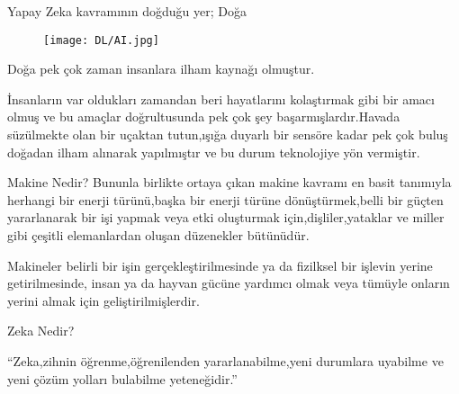 \documentclass{beamer}                                                                                          %
\begin{document}
	
	\begin{frame}{\color{myred1}
    		    Yapay Zeka kavramının doğduğu yer;  Doğa \color{black}}
	    \begin{center}
		    \justifying
		        \begin{figure}
    		        \vspace{-5}
    		        \centering
    		        \texttt{[image: DL/AI.jpg]}
		        \end{figure}
		        \vspace{20}
                \color{myred1} \color{black}Doğa pek çok zaman insanlara ilham kaynağı olmuştur.\par \vspace{10}
                \color{myred1} \color{black}İnsanların var oldukları zamandan beri hayatlarını kolaştırmak gibi bir amacı olmuş ve bu amaçlar doğrultusunda pek çok şey başarmışlardır.Havada süzülmekte olan bir uçaktan tutun,ışığa duyarlı bir sensöre kadar pek çok buluş doğadan ilham alınarak yapılmıştır ve bu durum teknolojiye yön vermiştir.

        \end{center}  
    \end{frame}
    
    \begin{frame}{Makine Nedir?}
        \justifying
            \color{myred1} \color{black}Bununla birlikte ortaya çıkan makine kavramı en basit tanımıyla  herhangi bir enerji türünü,başka bir enerji türüne dönüştürmek,belli bir güçten yararlanarak bir işi yapmak veya etki oluşturmak için,dişliler,yataklar ve miller gibi çeşitli elemanlardan oluşan düzenekler bütünüdür.\par \vspace{10}
            \color{myred1} \color{black}Makineler belirli bir işin gerçekleştirilmesinde ya da fizilksel bir işlevin yerine getirilmesinde, insan ya da hayvan gücüne yardımcı olmak veya tümüyle onların yerini almak için geliştirilmişlerdir.

    \end{frame}
    
  
    \begin{frame}{Zeka Nedir?}
        \justifying
        
        “Zeka,zihnin öğrenme,öğrenilenden yararlanabilme,yeni durumlara uyabilme ve yeni çözüm yolları bulabilme yeteneğidir.”
    \end{frame}
    
\end{document}
